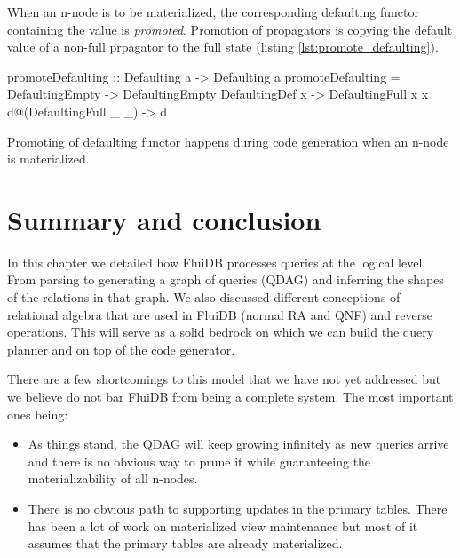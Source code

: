 When an n-node is to be materialized, the corresponding defaulting
functor containing the value is \emph{promoted}.  Promotion of
propagators is copying the default value of a non-full prpagator to
the full state (listing \ref{lst:promote_defaulting}).


\begin{code}
  \begin{haskellcode}
    promoteDefaulting :: Defaulting a -> Defaulting a
    promoteDefaulting = \case
      DefaultingEmpty        -> DefaultingEmpty
      DefaultingDef x        -> DefaultingFull x x
      d@(DefaultingFull _ _) -> d
  \end{haskellcode}

  \caption{\label{lst:promote_defaulting}Promoting of defaulting functor happens
    during code generation when an n-node is materialized.}
\end{code}

\section{Summary and conclusion}

In this chapter we detailed how FluiDB processes queries at the logical level. From
parsing to generating a graph of queries (QDAG) and inferring the
shapes of the relations in that graph. We also discussed different
conceptions of relational algebra that are used in FluiDB (normal RA
and QNF) and reverse operations. This will serve as a solid bedrock on
which we can build the query planner and on top of the code generator.

There are a few shortcomings to this model that we have not yet
addressed but we believe do not bar FluiDB from being a complete system.
The most important ones being:

\begin{itemize}
\item As things stand, the QDAG will keep growing infinitely as new
  queries arrive and there is no obvious way to prune it while
  guaranteeing the materializability of all n-nodes.
\item There is no obvious path to supporting updates in the primary
  tables. There has been a lot of work on materialized view
  maintenance but most of it assumes that the primary tables are
  already materialized.
\end{itemize}

